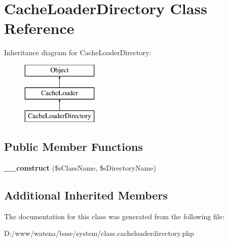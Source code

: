 \hypertarget{class_cache_loader_directory}{\section{Cache\-Loader\-Directory Class Reference}
\label{class_cache_loader_directory}
}
Inheritance diagram for Cache\-Loader\-Directory\-:\begin{figure}[H]
\begin{center}
\leavevmode
\includegraphics[height=3.000000cm]{class_cache_loader_directory}
\end{center}
\end{figure}
\subsection*{Public Member Functions}
\begin{DoxyCompactItemize}
\item 
\hypertarget{class_cache_loader_directory_af5b4c6696a9640ccafffc972b919244d}{{\bfseries \-\_\-\-\_\-construct} (\$s\-Class\-Name, \$s\-Directory\-Name)}\label{class_cache_loader_directory_af5b4c6696a9640ccafffc972b919244d}

\end{DoxyCompactItemize}
\subsection*{Additional Inherited Members}


The documentation for this class was generated from the following file\-:\begin{DoxyCompactItemize}
\item 
D\-:/www/watena/base/system/class.\-cacheloaderdirectory.\-php\end{DoxyCompactItemize}
